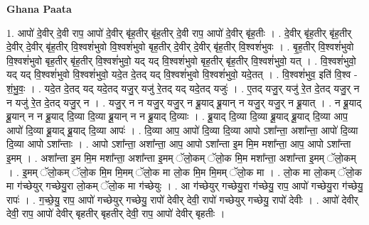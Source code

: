 \documentclass[17pt]{extarticle}
\begin{document}
\textbf{Ghana Paata } \newline

1. आपो॑ दे॒वीर् दे॒वी राप॒ आपो॑ दे॒वीर् बृ॑ह॒तीर् बृ॑ह॒तीर् दे॒वी राप॒ आपो॑ दे॒वीर् बृ॑ह॒तीः । . दे॒वीर् बृ॑ह॒तीर् बृ॑ह॒तीर् दे॒वीर् दे॒वीर् बृ॑ह॒तीर् वि॒श्वशं॑भुवो वि॒श्वशं॑भुवो बृह॒तीर् दे॒वीर् दे॒वीर् बृ॑ह॒तीर् वि॒श्वशं॑भुवः । . बृ॒ह॒तीर् वि॒श्वशं॑भुवो वि॒श्वशं॑भुवो बृह॒तीर् बृ॑ह॒तीर् वि॒श्वशं॑भुवो॒ यद् यद् वि॒श्वशं॑भुवो बृह॒तीर् बृ॑ह॒तीर् वि॒श्वशं॑भुवो॒ यत् । . वि॒श्वशं॑भुवो॒ यद् यद् वि॒श्वशं॑भुवो वि॒श्वशं॑भुवो॒ यदे॒त दे॒तद् यद् वि॒श्वशं॑भुवो वि॒श्वशं॑भुवो॒ यदे॒तत् । . वि॒श्वशं॑भुव॒ इति॑ वि॒श्व - शं॒भु॒वः॒ । . यदे॒त दे॒तद् यद् यदे॒तद् यजु॒र् यजु॑ रे॒तद् यद् यदे॒तद् यजुः॑ । . ए॒तद् यजु॒र् यजु॑ रे॒त दे॒तद् यजु॒र् न न यजु॑ रे॒त दे॒तद् यजु॒र् न । . यजु॒र् न न यजु॒र् यजु॒र् न ब्रू॒याद् ब्रू॒यान् न यजु॒र् यजु॒र् न ब्रू॒यात् । . न ब्रू॒याद् ब्रू॒यान् न न ब्रू॒याद् दि॒व्या दि॒व्या ब्रू॒यान् न न ब्रू॒याद् दि॒व्याः । . ब्रू॒याद् दि॒व्या दि॒व्या ब्रू॒याद् ब्रू॒याद् दि॒व्या आप॒ आपो॑ दि॒व्या ब्रू॒याद् ब्रू॒याद् दि॒व्या आपः॑ । . दि॒व्या आप॒ आपो॑ दि॒व्या दि॒व्या आपो ऽशा᳚न्ता॒ अशा᳚न्ता॒ आपो॑ दि॒व्या दि॒व्या आपो ऽशा᳚न्ताः । . आपो ऽशा᳚न्ता॒ अशा᳚न्ता॒ आप॒ आपो ऽशा᳚न्ता इ॒म मि॒म मशा᳚न्ता॒ आप॒ आपो ऽशा᳚न्ता इ॒मम् । . अशा᳚न्ता इ॒म मि॒म मशा᳚न्ता॒ अशा᳚न्ता इ॒मम् ॅलो॒कम् ॅलो॒क मि॒म मशा᳚न्ता॒ अशा᳚न्ता इ॒मम् ॅलो॒कम् । . इ॒मम् ॅलो॒कम् ॅलो॒क मि॒म मि॒मम् ॅलो॒क मा लो॒क मि॒म मि॒मम् ॅलो॒क मा । . लो॒क मा लो॒कम् ॅलो॒क मा ग॑च्छेयुर् गच्छेयु॒रा लो॒कम् ॅलो॒क मा ग॑च्छेयुः । . आ ग॑च्छेयुर् गच्छेयु॒रा ग॑च्छेयु॒ राप॒ आपो॑ गच्छेयु॒रा ग॑च्छेयु॒ रापः॑ । . ग॒च्छे॒यु॒ राप॒ आपो॑ गच्छेयुर् गच्छेयु॒ रापो॑ देवीर् देवी॒ रापो॑ गच्छेयुर् गच्छेयु॒ रापो॑ देवीः । . आपो॑ देवीर् देवी॒ राप॒ आपो॑ देवीर् बृहतीर् बृहतीर् देवी॒ राप॒ आपो॑ देवीर् बृहतीः । \newline
\end{document}
